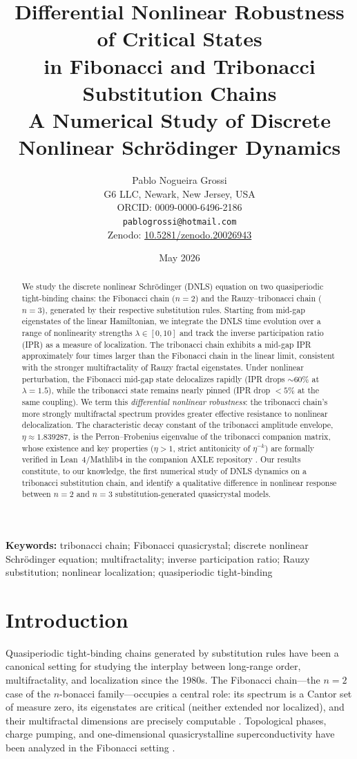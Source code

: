 \documentclass[12pt,a4paper]{article}
\title{\textbf{Differential Nonlinear Robustness of Critical States\\
in Fibonacci and Tribonacci Substitution Chains}\\[0.5em]
\large A Numerical Study of Discrete Nonlinear Schr\"{o}dinger Dynamics}
\author{Pablo Nogueira Grossi\\
G6 LLC, Newark, New Jersey, USA\\
ORCID: 0009-0000-6496-2186\\
\texttt{pablogrossi@hotmail.com}\\[0.3em]
\small Zenodo: \href{https://doi.org/10.5281/zenodo.20026943}{10.5281/zenodo.20026943}}
\date{May 2026}
\begin{document}
\maketitle

\begin{abstract}
We study the discrete nonlinear Schr\"{o}dinger (DNLS) equation on two
quasiperiodic tight-binding chains: the Fibonacci chain ($n=2$) and the
Rauzy--tribonacci chain ($n=3$), generated by their respective substitution
rules. Starting from mid-gap eigenstates of the linear Hamiltonian, we
integrate the DNLS time evolution over a range of nonlinearity strengths
$\lambda \in [0,10]$ and track the inverse participation ratio (IPR) as a
measure of localization. The tribonacci chain exhibits a mid-gap IPR
approximately four times larger than the Fibonacci chain in the linear limit,
consistent with the stronger multifractality of Rauzy fractal eigenstates.
Under nonlinear perturbation, the Fibonacci mid-gap state delocalizes rapidly
(IPR drops $\sim 60\%$ at $\lambda = 1.5$), while the tribonacci state
remains nearly pinned (IPR drop $< 5\%$ at the same coupling). We term this
\emph{differential nonlinear robustness}: the tribonacci chain's more
strongly multifractal spectrum provides greater effective resistance to
nonlinear delocalization. The characteristic decay constant of the
tribonacci amplitude envelope, $\eta \approx 1.839287$, is the
Perron--Frobenius eigenvalue of the tribonacci companion matrix, whose
existence and key properties ($\eta > 1$, strict antitonicity of $\eta^{-k}$)
are formally verified in Lean~4/Mathlib4 in the companion AXLE repository
\cite{AXLE2026}. Our results constitute, to our knowledge, the first
numerical study of DNLS dynamics on a tribonacci substitution chain, and
identify a qualitative difference in nonlinear response between $n=2$ and
$n=3$ substitution-generated quasicrystal models.
\end{abstract}

\textbf{Keywords:} tribonacci chain; Fibonacci quasicrystal; discrete
nonlinear Schr\"{o}dinger equation; multifractality; inverse participation
ratio; Rauzy substitution; nonlinear localization; quasiperiodic tight-binding

\section{Introduction}

Quasiperiodic tight-binding chains generated by substitution rules have been
a canonical setting for studying the interplay between long-range order,
multifractality, and localization since the 1980s. The Fibonacci chain---the
$n=2$ case of the $n$-bonacci family---occupies a central role: its spectrum
is a Cantor set of measure zero, its eigenstates are critical (neither
extended nor localized), and their multifractal dimensions are precisely
computable \cite{Kohmoto1983,Ostlund1983,Luck1989,Mace2017}. Topological
phases, charge pumping, and one-dimensional quasicrystalline superconductivity
have been analyzed in the Fibonacci setting \cite{Kraus2012,Lang2012}.
\end{document}
